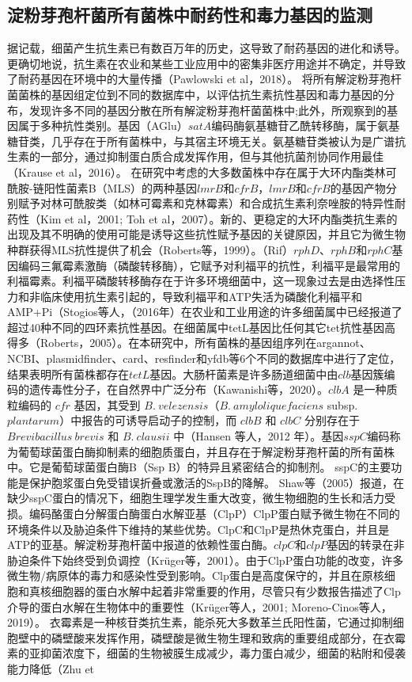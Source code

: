 \documentclass[UTF8]{ctexart}
\begin{document}
\subsection{淀粉芽孢杆菌所有菌株中耐药性和毒力基因的监测}

据记载，细菌产生抗生素已有数百万年的历史，这导致了耐药基因的进化和诱导。更确切地说，抗生素在农业和某些工业应用中的密集非医疗用途并不确定，并导致了耐药基因在环境中的大量传播（Pawlowski et al，2018）。 将所有解淀粉芽孢杆菌菌株的基因组定位到不同的数据库中，以评估抗生素抗性基因和毒力基因的分布，发现许多不同的基因分散在所有解淀粉芽孢杆菌菌株中;此外，所观察到的基因属于多种抗性类别。基因（AGlu）$satA$编码酶氨基糖苷乙酰转移酶，属于氨基糖苷类，几乎存在于所有菌株中，与其宿主环境无关。氨基糖苷类被认为是广谱抗生素的一部分，通过抑制蛋白质合成发挥作用，但与其他抗菌剂协同作用最佳（Krause et al，2016）。 在研究中考虑的大多数菌株中存在属于大环内酯类林可酰胺-链阳性菌素B（MLS）的两种基因$lmrB$和$cfrB$，$lmrB$和$cfrB$的基因产物分别赋予对林可酰胺类（如林可霉素和克林霉素）和合成抗生素利奈唑胺的特异性耐药性（Kim et al，2001; Toh et al，2007）。新的、更稳定的大环内酯类抗生素的出现及其不明确的使用可能是诱导这些抗性赋予基因的关键原因，并且它为微生物种群获得MLS抗性提供了机会（Roberts等，1999）。（Rif）$rphD$、$rphB$和$rphC$基因编码三氟霉素激酶（磷酸转移酶），它赋予对利福平的抗性，利福平是最常用的利福霉素。利福平磷酸转移酶存在于许多环境细菌中，这一现象过去是由选择性压力和非临床使用抗生素引起的，导致利福平和ATP失活为磷酸化利福平和AMP+Pi（Stogios等人，（2016年）在农业和工业用途的许多细菌属中已经报道了超过40种不同的四环素抗性基因。在细菌属中tetL基因比任何其它tet抗性基因高得多（Roberts，2005）。在本研究中，所有菌株的基因组序列在argannot、NCBI、plasmidfinder、card、resfinder和yfdb等6个不同的数据库中进行了定位，结果表明所有菌株都存在$tetL$基因。大肠杆菌素是许多肠道细菌中由$clb$基因簇编码的遗传毒性分子，在自然界中广泛分布（Kawanishi等，2020）。$clbA$ 是一种质粒编码的 $cfr$ 基因，其受到 $B.~velezensis$（$B.~amyloliquefaciens$ subsp. $plantarum$）中报告的可诱导启动子的控制，而 $clbB$ 和 $clbC$ 分别存在于 $Brevibacillus~brevis$ 和 $B.~clausii$ 中（Hansen 等人，2012 年）。基因$sspC$编码称为葡萄球菌蛋白酶抑制素的细胞质蛋白，并且存在于解淀粉芽孢杆菌的所有菌株中。它是葡萄球菌蛋白酶B（Ssp B）的特异且紧密结合的抑制剂。 sspC的主要功能是保护胞浆蛋白免受错误折叠或激活的SspB的降解。 Shaw等（2005）报道，在缺少sspC蛋白的情况下，细胞生理学发生重大改变，微生物细胞的生长和活力受损。编码酪蛋白分解蛋白酶蛋白水解亚基（ClpP）ClpP蛋白赋予微生物在不同的环境条件以及胁迫条件下维持的某些优势。ClpC和ClpP是热休克蛋白，并且是ATP的亚基。解淀粉芽孢杆菌中报道的依赖性蛋白酶。$clpC$和$clpP$基因的转录在非胁迫条件下始终受到负调控（Krüger等，2001）。由于ClpP蛋白功能的改变，许多微生物/病原体的毒力和感染性受到影响。Clp蛋白是高度保守的，并且在原核细胞和真核细胞器的蛋白水解中起着非常重要的作用，尽管只有少数报告描述了Clp介导的蛋白水解在生物体中的重要性（Krüger等人，2001; Moreno-Cinos等人，2019）。 衣霉素是一种核苷类抗生素，能杀死大多数革兰氏阳性菌，它通过抑制细胞壁中的磷壁酸来发挥作用，磷壁酸是微生物生理和致病的重要组成部分，在衣霉素的亚抑菌浓度下，细菌的生物被膜生成减少，毒力蛋白减少，细菌的粘附和侵袭能力降低（Zhu et 
\end{document}
